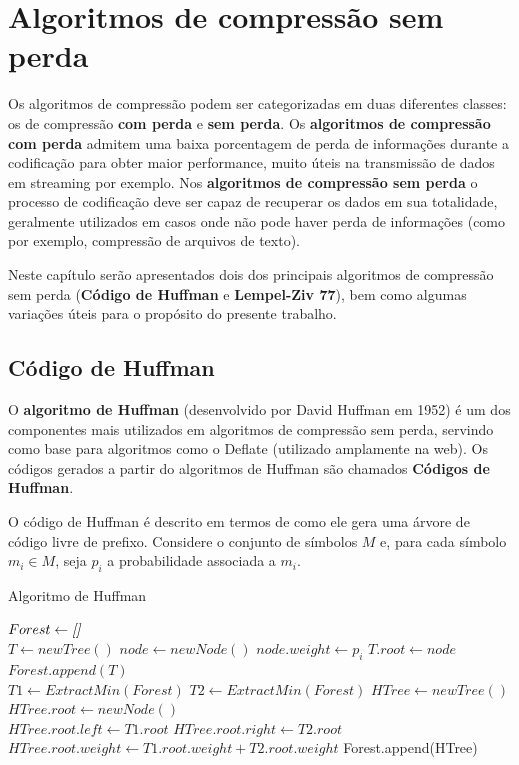 \chapter{Algoritmos de compressão sem perda}

Os algoritmos de compressão podem ser categorizadas em duas diferentes classes: os de compressão \textbf{com perda} e \textbf{sem perda}. 
Os \textbf{algoritmos de compressão com perda} admitem uma baixa porcentagem de perda de informações durante a codificação para obter maior performance, muito úteis na transmissão de dados em streaming por exemplo. 
Nos \textbf{algoritmos de compressão sem perda} o processo de codificação deve ser capaz de recuperar os dados em sua totalidade, geralmente utilizados em casos onde não pode haver perda de informações (como por exemplo, compressão de arquivos de texto).

Neste capítulo serão apresentados dois dos principais algoritmos de compressão sem perda (\textbf{Código de Huffman} e \textbf{Lempel-Ziv 77}), bem como algumas variações úteis para o propósito do presente trabalho.

\pagebreak

\section{Código de Huffman} \label{sec:huff}
O \textbf{algoritmo de Huffman} (desenvolvido por David Huffman em 1952) é um dos componentes mais utilizados em algoritmos de compressão sem perda, servindo como base para algoritmos como o Deflate (utilizado amplamente na web).
Os códigos gerados a partir do algoritmos de Huffman são chamados \textbf{Códigos de Huffman}.

O código de Huffman é descrito em termos de como ele gera uma árvore
de código livre de prefixo.  Considere o conjunto de símbolos $M$ e,
para cada símbolo $m_i\in M$, seja $p_i$ a probabilidade associada a
$m_i$.

\begin{algorithm}[H]
\caption{Algoritmo de Huffman} \label{alg:huff}
\begin{algorithmic}
	\State $Forest \gets \emph{[]}$\\
	 
		\State $T \gets newTree()$
		\State $node \gets newNode()$
		\State $node.weight \gets p_i$ 
		\State $T.root \gets node$
		\State $Forest.append(T)$ 
	\EndFor \\
	
		\State $T1 \gets ExtractMin(Forest)$ 
		\State $T2 \gets ExtractMin(Forest)$
		\State $HTree \gets newTree()$
		\State $HTree.root \gets newNode()$ \\
		\State $HTree.root.left \gets T1.root$
		\State $HTree.root.right \gets T2.root$
		\State $HTree.root.weight \gets T1.root.weight + T2.root.weight$
		\State Forest.append(HTree) 
	\EndWhile
\end{algorithmic}
\end{algorithm}

